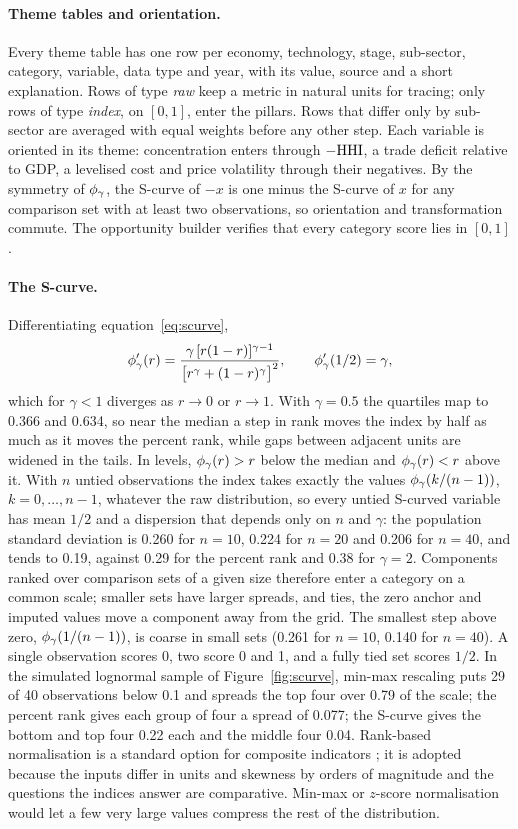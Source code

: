 \paragraph{Theme tables and orientation.} Every theme table has one row per economy, technology,
stage, sub-sector, category, variable, data type and year, with its value, source and a short
explanation. Rows of type \emph{raw} keep a metric in natural units for tracing; only rows of type
\emph{index}, on $[0,1]$, enter the pillars. Rows that differ only by sub-sector are averaged with
equal weights before any other step. Each variable is oriented in its theme: concentration enters
through $-\mathrm{HHI}$, a trade deficit relative to GDP, a levelised cost and price volatility through
their negatives. By the symmetry of $\phi_{\gamma}$, the S-curve of $-x$ is one minus the S-curve of $x$
for any comparison set with at least two observations, so orientation and transformation commute.
The opportunity builder verifies that every category score lies in $[0,1]$.

\paragraph{The S-curve.} Differentiating equation~\eqref{eq:scurve},
\begin{equation}\label{eq:scurve_slope}
  \phi_{\gamma}'(r)=\frac{\gamma\,[r(1-r)]^{\gamma-1}}{\bigl[r^{\gamma}+(1-r)^{\gamma}\bigr]^{2}},
  \qquad \phi_{\gamma}'(1/2)=\gamma ,
\end{equation}
which for $\gamma<1$ diverges as $r\to0$ or $r\to1$. With $\gamma=0.5$ the quartiles map to
0.366 and 0.634, so near the median a step in rank moves the index by half as much as it moves the
percent rank, while gaps between adjacent units are widened in the tails. In levels, $\phi_{\gamma}(r)>r$
below the median and $\phi_{\gamma}(r)<r$ above it. With $n$ untied observations the index takes exactly
the values $\phi_{\gamma}(k/(n-1))$, $k=0,\dots,n-1$, whatever the raw distribution, so every untied
S-curved variable has mean $1/2$ and a dispersion that depends only on $n$ and $\gamma$: the
population standard deviation is 0.260 for $n=10$, 0.224 for $n=20$ and 0.206 for $n=40$, and
tends to 0.19, against 0.29 for the percent rank and 0.38 for $\gamma=2$. Components ranked over
comparison sets of a given size therefore enter a category on a common scale; smaller sets have
larger spreads, and ties, the zero anchor and imputed values move a component away from the grid.
The smallest step above zero, $\phi_{\gamma}(1/(n-1))$, is coarse in small sets (0.261 for $n=10$,
0.140 for $n=40$). A single observation scores 0, two score 0 and 1, and a fully tied set scores
$1/2$. In the simulated lognormal sample of Figure~\ref{fig:scurve}, min-max rescaling puts 29 of
40 observations below 0.1 and spreads the top four over 0.79 of the scale; the percent rank gives
each group of four a spread of 0.077; the S-curve gives the bottom and top four 0.22 each and the
middle four 0.04. Rank-based normalisation is a standard option for composite indicators
\citep{oecd2008handbook}; it is adopted because the inputs differ in units and skewness by orders
of magnitude and the questions the indices answer are comparative. Min-max or $z$-score
normalisation would let a few very large values compress the rest of the distribution.


